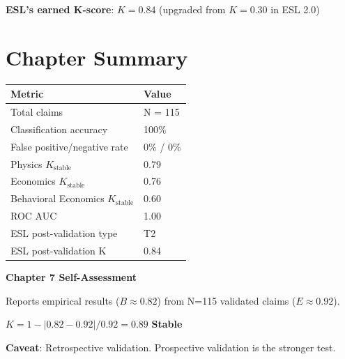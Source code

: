 \documentclass[11pt,a4paper]{article}
\theoremstyle{remark}
\begin{document}
\textbf{ESL's earned K-score}: $K = 0.84$ (upgraded from $K = 0.30$ in ESL 2.0)

\section{Chapter Summary}
\label{sec:summary}

\begin{resultbox}[title={ESL 2.2 Validation Summary}]
\begin{center}
\begin{tabular}{ll}
\toprule
\textbf{Metric} & \textbf{Value} \\
\midrule
Total claims & N = 115 \\
Classification accuracy & 100\% \\
False positive/negative rate & 0\% / 0\% \\
Physics $K_{\text{stable}}$ & 0.79 \\
Economics $K_{\text{stable}}$ & 0.76 \\
Behavioral Economics $K_{\text{stable}}$ & 0.60 \\
ROC AUC & 1.00 \\
ESL post-validation type & T2 \\
ESL post-validation K & 0.84 \\
\bottomrule
\end{tabular}
\end{center}
\end{resultbox}

\begin{eslbox}
\textbf{Chapter 7 Self-Assessment}

Reports empirical results ($B \approx 0.82$) from N=115 validated claims ($E \approx 0.92$).

$K = 1 - |0.82 - 0.92|/0.92 = 0.89$ \quad \textcolor{eslgreen}{\textbf{Stable}}

\textbf{Caveat}: Retrospective validation. Prospective validation is the stronger test.
\end{eslbox}
\end{document}
